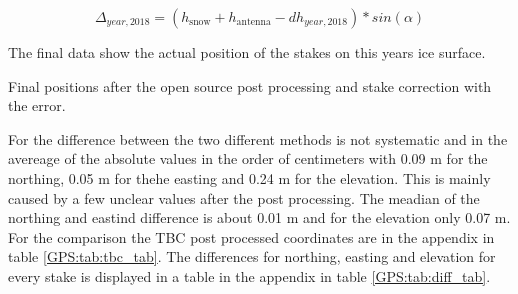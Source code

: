 \begin{equation}
	\Delta_{year,2018} = (h_{\text{snow}} + h_{\text{antenna}} - dh_{year,2018}) * sin(\alpha)
\end{equation}

The final data show the actual position of the stakes on this years ice surface.

\begin{table}[H]
	\caption{Final positions after the open source post processing and stake correction with the error.}
	\centering
	
	\label{GPS:tab:os_tab}
\end{table}

For the difference between the two different methods is not systematic and in the avereage of the absolute values in the order of centimeters with 0.09 m for the northing, 0.05 m for thehe  easting and 0.24 m for the elevation. This is mainly caused by a few unclear values after the post processing. The meadian of the northing and eastind difference is about 0.01 m and for the elevation only 0.07 m. For the comparison the TBC post processed coordinates are in the appendix in table \ref{GPS:tab:tbc_tab}.
The differences for northing, easting and elevation for every stake is displayed in a table in the appendix in table \ref{GPS:tab:diff_tab}. 
